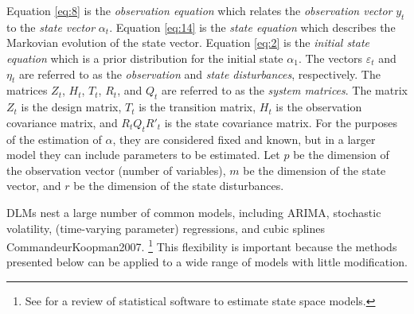 \documentclass{article}
\begin{document}
Equation \eqref{eq:8} is the \textit{observation equation} which relates the \textit{observation vector} $y_{t}$ to the \textit{state vector} $\alpha_{t}$.
Equation \eqref{eq:14} is the \textit{state equation} which describes the Markovian evolution of the state vector.
Equation \eqref{eq:2} is the \textit{initial state equation} which is a prior distribution for the initial state $\alpha_{1}$.
The vectors $\varepsilon_{t}$ and $\eta_{t}$ are referred to as the \textit{observation} and \textit{state disturbances}, respectively.
The matrices $Z_{t}$, $H_{t}$, $T_{t}$, $R_{t}$, and $Q_{t}$ are referred to as the \textit{system matrices}.
The matrix $Z_{t}$ is the design matrix, $T_{t}$ is the transition matrix, $H_{t}$ is the observation covariance matrix, and $R_{t} Q_{t} R'_{t}$ is the state covariance matrix.
For the purposes of the estimation of $\alpha$, they are considered fixed and known, but in a larger model they can include parameters to be estimated.
Let $p$ be the dimension of the observation vector (number of variables), $m$ be the dimension of the state vector, and $r$ be the dimension of the state disturbances.

DLMs nest a large number of common models, including ARIMA, stochastic volatility, (time-varying parameter) regressions,
and cubic splines \parencites{WestHarrison1997}{DurbinKoopman2001}\parencite{PetrisPetroneEtAl2009}{CommandeurKoopman2007}.%
\footnote{See \textcite{CommandeurKoopmanOoms2011} for a review of statistical software to estimate state space models.}
This flexibility is important because the methods presented below can be applied to a wide range of models with little modification.
\end{document}
